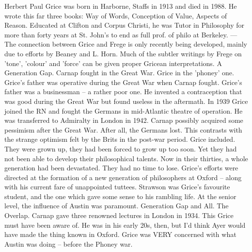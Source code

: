 \documentclass[10pt,titlepage]{book}
\begin{document}
{Herbert Paul Grice was born in Harborne, Staffs 
in 1913 and died in  1988. He wrote this far three books: Way of Words, 
Conception of Value, Aspects  of Reason. Educated at Clifton and Corpus Christi, 
he was Tutor in Philosophy  for more than forty years at St. John's to end 
as full prof. of philo at  Berkeley. ---  The connection between Grice and 
Frege is only recently being developed, mainly  due to efforts by Beaney and 
L. Horn. Much of the subtler writings by Frege on  'tone', 'colour' and 
'force' can be given proper Gricean  interpretations. 
A  Generation Gap. Carnap fought in the Great War. Grice in the 'phoney' 
one.  Grice's father was operative during the Great War when Carnap fought. 
Grice's  father was a businessman -- a rather poor one. He invented a 
contraception that  was good during the Great War but found useless in the 
aftermath. In 1939 Grice  joined the RN and fought the Germans in mid-Atlantic 
theatre of operation. He  was transferred to Admiralty in London in 1942. Carnap 
possibly acquired some  pessimism after the Great War. After all, the Germans 
lost. This contrasts  with the strange optimism felt by the Brits in the 
post-war period. Grice  included. They were grown up, they had been forced to 
grow up too soon. Yet they  had not been able to develop their philosophical 
talents. Now in their thirties,  a whole generation had been devastated. 
They had no time to lose. Grice's  efforts were directed at the formation of a 
new generation of philosophers at  Oxford -- along with his current fare of 
unappointed tuttees. Strawson was  Grice's favourite student, and the one 
which gave some sense to his rambling  life. At the senior level, the 
influence of Austin was  paramount. 
Generation  Gap and All. The Overlap. Carnap gave three renowned lectures 
in London in 1934. This  Grice must have been aware of. He was in his early 
20s, then, but I’d think Ayer  would have made the thing known in Oxford. 
Grice was VERY  concerned with  what Austin was doing -- before the Phoney war.

}
\end{document}
